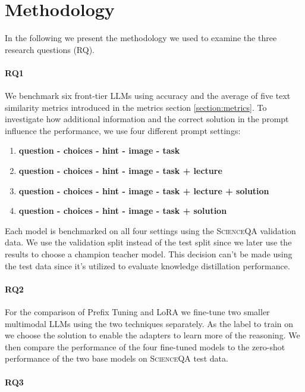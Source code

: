\documentclass{article}
\begin{document}
\section{Methodology}
\label{section:methodology}
In the following we present the methodology we used to examine the three research questions (RQ).
\paragraph{RQ1} We benchmark six front-tier LLMs using accuracy and the average of five text similarity metrics introduced in the metrics section \ref{section:metrics}. 
To investigate how additional information and the correct solution in the prompt influence the performance, we use four different prompt settings: 
\begin{enumerate}
	\item \textbf{question - choices - hint - image - task}
	\item \textbf{question - choices - hint - image - task + lecture}
	\item \textbf{question - choices - hint - image - task + lecture + solution}
	\item \textbf{question - choices - hint - image - task + solution}
\end{enumerate}
Each model is benchmarked on all four settings using the \textsc{ScienceQA} validation data. We use the validation split instead of the test split since we later use the results to choose a champion teacher model. This decision can't be made using the test data since it's utilized to evaluate knowledge distillation performance.

\paragraph{RQ2} For the comparison of Prefix Tuning and LoRA we fine-tune two smaller multimodal LLMs
using the two techniques separately. As the label to train on we choose the solution to enable the adapters to learn more of the reasoning. We then compare the performance of the four fine-tuned models to the zero-shot performance of the two base models on \textsc{ScienceQA} test data.

\paragraph{RQ3} 
\end{document}
